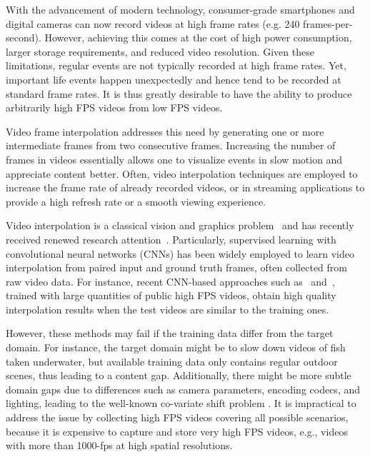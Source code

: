 \documentclass[10pt,twocolumn,letterpaper]{article}
\begin{document}
With the advancement of modern technology, consumer-grade smartphones and digital cameras can now record videos at high frame rates (e.g. 240 frames-per-second). However, achieving this comes at the cost of high power consumption, larger storage requirements, and reduced video resolution. Given these limitations, regular events are not typically recorded at high frame rates. Yet, important life events happen unexpectedly and hence tend to be recorded at standard frame rates.
It is thus greatly desirable to have the ability to produce arbitrarily high FPS videos from low FPS videos. 

Video frame interpolation addresses this need by generating one or more intermediate frames from two consecutive frames.
Increasing the number of frames in videos essentially allows one to visualize events in slow motion and appreciate content better.
Often, video interpolation techniques are employed to increase the frame rate of already recorded videos, or in streaming applications to provide a high refresh rate or a smooth viewing experience. 

Video interpolation is a classical vision and graphics problem~\cite{Baker2009OcclusionInterpolation,szeliski1999prediction,zitnick2004high}  and has recently received renewed research attention~\cite{long16learning,Niklaus_2017_ICCV,long2016learning,Niklaus_2018_CVPR}. Particularly, supervised learning with convolutional neural networks (CNNs) has been widely employed to learn video interpolation from paired input and ground truth frames, often collected from raw video data. For instance, recent CNN-based approaches such as~\cite{jiang2018super} and~\cite{Niklaus_2017_ICCV}, trained with large quantities of public high FPS videos, obtain high quality interpolation results when the test videos are similar to the training ones.

However, these methods may fail if the training data differ from the target domain. For instance, the target domain might be to slow down videos of fish taken underwater, but available training data only contains regular outdoor scenes, thus leading to a content gap. Additionally, there might be more subtle domain gaps due to differences such as camera parameters, encoding codecs, and lighting, leading to the well-known co-variate shift problem \cite{shimodaira2000improving}. It is impractical to address the issue by collecting high FPS videos covering all possible scenarios, because it is expensive to capture and store very high FPS videos, e.g., videos with more than 1000-fps at high spatial resolutions.
\end{document}
